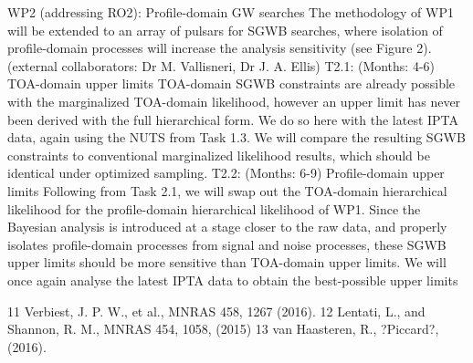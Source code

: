 \documentclass[11pt,letterpaper,sans]{moderncv} %
\begin{document}
WP2 (addressing RO2): Profile-domain GW searches
The methodology of WP1 will be extended to an array of pulsars for SGWB searches, where isolation of profile-domain processes will increase the analysis sensitivity (see Figure 2). (external collaborators: Dr M. Vallisneri, Dr J. A. Ellis)
	T2.1: (Months: 4-6) TOA-domain upper limits
	TOA-domain SGWB constraints are already possible with the marginalized TOA-domain likelihood, however an upper limit has never been derived with the full hierarchical form. We do so here with the latest IPTA data, again using the NUTS from Task 1.3. We will compare the resulting SGWB constraints to conventional marginalized likelihood results, which should be identical under optimized sampling.
	T2.2: (Months: 6-9) Profile-domain upper limits
	Following from Task 2.1, we will swap out the TOA-domain hierarchical likelihood for the profile-domain hierarchical likelihood of WP1. Since the Bayesian analysis is introduced at a stage closer to the raw data, and properly isolates profile-domain processes from signal and noise processes, these SGWB upper limits should be more sensitive than TOA-domain upper limits. We will once again analyse the latest IPTA data to obtain the best-possible upper limits

11 Verbiest, J. P. W., et al., MNRAS 458, 1267 (2016).
12 Lentati, L., and Shannon, R. M., MNRAS 454, 1058, (2015)
13 van Haasteren, R., ?Piccard?, (2016).
\end{document}
